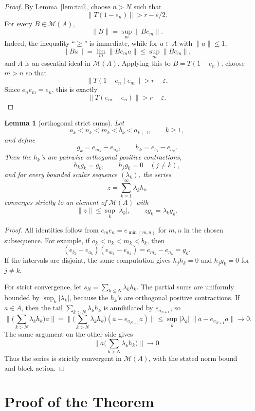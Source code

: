 \documentclass[11pt]{article}
\newtheorem{lemma}{Lemma}
\newcommand{\M}{\mathcal M}
\begin{document}
\begin{proof}
By Lemma~\ref{lem:tail}, choose \(n>N\) such that
\[
        \|T(1-e_n)\|>r-\varepsilon/2.
\]
For every \(B\in\M(A)\),
\[
        \|B\|=\sup_m \|B e_m\|.
\]
Indeed, the inequality ``\(\ge\)'' is immediate, while for \(a\in A\) with
\(\|a\|\le1\),
\[
        \|Ba\|=\lim_m\|B e_m a\|\le \sup_m\|B e_m\|,
\]
and \(A\) is an essential ideal in \(\M(A)\).  Applying this to
\(B=T(1-e_n)\), choose \(m>n\) so that
\[
        \|T(1-e_n)e_m\|>r-\varepsilon.
\]
Since \(e_ne_m=e_n\), this is exactly
\[
        \|T(e_m-e_n)\|>r-\varepsilon.
\]
\end{proof}

\begin{lemma}[orthogonal strict sums]
\label{lem:strict-sum}
Let
\[
        a_k<n_k<m_k<b_k<a_{k+1},\qquad k\ge1,
\]
and define
\[
        g_k=e_{m_k}-e_{n_k},\qquad h_k=e_{b_k}-e_{a_k}.
\]
Then the \(h_k\)'s are pairwise orthogonal positive contractions,
\[
        h_k g_k=g_k,\qquad h_jg_k=0\quad(j\ne k),
\]
and for every bounded scalar sequence \((\lambda_k)\), the series
\[
        z=\sum_{k=1}^{\infty}\lambda_k h_k
\]
converges strictly to an element of \(\M(A)\) with
\[
        \|z\|\le \sup_k|\lambda_k|,
        \qquad
        z g_k=\lambda_k g_k.
\]
\end{lemma}

\begin{proof}
All identities follow from \(e_me_n=e_{\min(m,n)}\) for \(m,n\) in the chosen
subsequence.  For example, if \(a_k<n_k<m_k<b_k\), then
\[
        (e_{b_k}-e_{a_k})(e_{m_k}-e_{n_k})=e_{m_k}-e_{n_k}=g_k.
\]
If the intervals are disjoint, the same computation gives \(h_jh_k=0\) and
\(h_jg_k=0\) for \(j\ne k\).

For strict convergence, let \(s_N=\sum_{k\le N}\lambda_kh_k\).  The partial
sums are uniformly bounded by \(\sup_k|\lambda_k|\), because the \(h_k\)'s are
orthogonal positive contractions.  If \(a\in A\), then the tail
\(\sum_{k>N}\lambda_kh_k\) is annihilated by \(e_{a_{N+1}}\), so
\[
        \Big\|\Big(\sum_{k>N}\lambda_kh_k\Big)a\Big\|
        =
        \Big\|\Big(\sum_{k>N}\lambda_kh_k\Big)(a-e_{a_{N+1}}a)\Big\|
        \le
        \sup_k|\lambda_k|\,\|a-e_{a_{N+1}}a\|\to0.
\]
The same argument on the other side gives
\[
        \Big\|a\Big(\sum_{k>N}\lambda_kh_k\Big)\Big\|\to0.
\]
Thus the series is strictly convergent in \(\M(A)\), with the stated norm
bound and block action.
\end{proof}

\section*{Proof of the Theorem}
\end{document}

